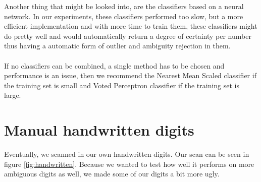 \documentclass[%
        compressed,
        final,
        notitlepage,
        narroweqnarray,
        inline,
        twoside,
        ]{ieee}
\begin{document}
Another thing that might be looked into, are the classifiers based on a neural
network. In our experiments, these classifiers performed too slow, but a more
efficient implementation and with more time to train them, these classifiers
might do pretty well and would automatically return a degree of certainty per number thus having a automatic form of outlier and ambiguity rejection in them.\\\\
If no classifiers can be combined, a single method has to be chosen and
performance is an issue, then we recommend the Nearest Mean Scaled classifier if
the training set is small and Voted Perceptron classifier if the training set is
large.

\pagebreak
\appendix

\section{Manual handwritten digits}
Eventually, we scanned in our own handwritten digits. Our scan can be seen in figure
\ref{fig:handwritten}. Because we wanted to test how well it performs on
more ambiguous digits as well, we made some of our digits a bit more ugly.
\end{document}
